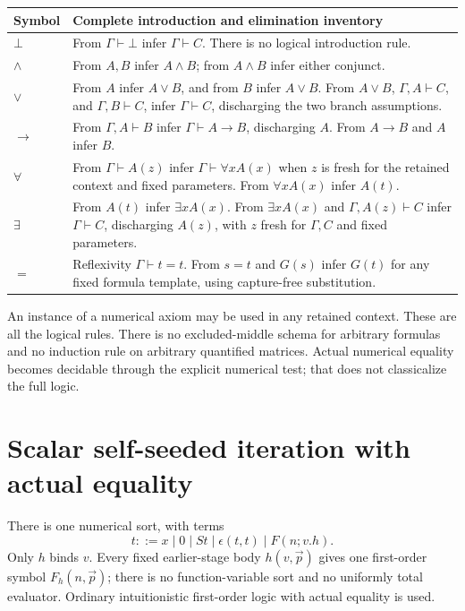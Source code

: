 \documentclass[11pt,letterpaper]{article}
\theoremstyle{definition}\newtheorem{definition}[theorem]{Definition}
\theoremstyle{remark}\newtheorem{remark}[theorem]{Remark}
\begin{document}
\begin{center}\small
\begin{tabularx}{\linewidth}{@{}lX@{}}
\toprule
Symbol & Complete introduction and elimination inventory\\\midrule
$\bot$ & From $\Gamma\vdash\bot$ infer $\Gamma\vdash C$.
There is no logical introduction rule.\\[3pt]
$\land$ & From $A,B$ infer $A\land B$; from $A\land B$ infer either conjunct.\\[3pt]
$\lor$ & From $A$ infer $A\lor B$, and from $B$ infer $A\lor B$.
From $A\lor B$, $\Gamma,A\vdash C$, and $\Gamma,B\vdash C$, infer
$\Gamma\vdash C$, discharging the two branch assumptions.\\[3pt]
$\to$ & From $\Gamma,A\vdash B$ infer $\Gamma\vdash A\to B$, discharging
$A$. From $A\to B$ and $A$ infer $B$.\\[3pt]
$\forall$ & From $\Gamma\vdash A(z)$ infer $\Gamma\vdash\forall x A(x)$
when $z$ is fresh for the retained context and fixed parameters.
From $\forall x A(x)$ infer $A(t)$.\\[3pt]
$\exists$ & From $A(t)$ infer $\exists x A(x)$.
From $\exists x A(x)$ and $\Gamma,A(z)\vdash C$ infer $\Gamma\vdash C$,
discharging $A(z)$, with $z$ fresh for $\Gamma,C$ and fixed parameters.\\[3pt]
$=$ & Reflexivity $\Gamma\vdash t=t$.
From $s=t$ and $G(s)$ infer $G(t)$ for any fixed formula template,
using capture-free substitution.\\
\bottomrule
\end{tabularx}
\end{center}
An instance of a numerical axiom may be used in any retained context.
These are all the logical rules. There is no excluded-middle schema for
arbitrary formulas and no induction rule on arbitrary quantified
matrices. Actual numerical equality becomes decidable through the
explicit numerical test; that does not classicalize the full logic.


\section{Scalar self-seeded iteration with actual equality}
\label{sec:selfseed-theory}
There is one numerical sort, with terms
\[
 t ::= x\mid 0\mid St\mid \epsilon(t,t)\mid F(n;v.h).
\]
Only $h$ binds $v$. Every fixed earlier-stage body $h(v,\vec p)$ gives
one first-order symbol $F_h(n,\vec p)$; there is no function-variable
sort and no uniformly total evaluator. Ordinary intuitionistic
first-order logic with actual equality is used.
\end{document}

